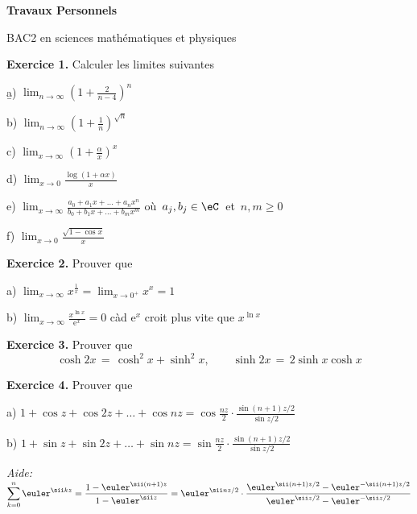 \begin{center}
\LARGE \bf
Travaux Personnels 
\end{center}

\begin{bf}
\begin{center}
BAC2 en sciences mathématiques et physiques
\end{center}
\end{bf}

{\bf Exercice 1.} Calculer les limites suivantes

\b
a) $\displaystyle \lim_{n \to \infty} \left( 1+ \frac{2}{n-4} \right)^n$

\medskip
b) 
$\displaystyle \lim_{n \to \infty} 
         \left( 1+ \frac 1n \right)^{\sqrt{n}}$

\medskip
c) $\displaystyle \lim_{x \to \infty} 
    \left( 1+ \frac \alpha x \right)^x$

\medskip
d) 
$\displaystyle \lim_{x \to 0} \frac{\log \left( 1+ \alpha x \right)}{x}$


\medskip
e) 
$\displaystyle \lim_{x \to \infty} 
\frac{a_0+a_1x + \dots +a_nx^n}{b_0+b_1x + \dots +b_mx^m}$
\quad où\, $a_j, b_j \in \eC$ \,et\, $n,m \ge 0$

\medskip
f) 
$\displaystyle \lim_{x \to 0} \frac{\sqrt{1-\cos x}}{x}$  




{\bf Exercice 2.} Prouver que

\medskip
a)
$\displaystyle \lim_{x \to \infty} x^{\frac 1x} = \lim_{x \to 0^+} x^x = 1$

\medskip
b)
$\displaystyle \lim_{x \to \infty} \frac{x^{\ln x}}{{\mathrm e}^x} =0$
\quad
càd ${\mathrm e}^x$ croit plus vite que $x^{\ln x}$


{\bf Exercice 3.} Prouver que
$$
\cosh 2x \,=\, \cosh^2 x + \sinh^2 x,
\qquad
\sinh 2x \,=\, 2 \sinh x \cosh x
$$


{\bf Exercice 4.} Prouver que

a)
$1 + \cos z + \cos 2z + \dots + \cos nz = \displaystyle \cos \frac{nz}{2} \cdot \frac{\sin (n+1)z/2}{\sin z/2}$

b)
$1 + \sin z + \sin 2z + \dots + \sin nz = \displaystyle \sin \frac{nz}{2} \cdot \frac{\sin (n+1)z/2}{\sin z/2}$

{\it Aide:}\;
$\displaystyle \sum_{k=0}^n 
\euler^{\sii kz} 
= 
\frac{1-\euler^{\sii (n+1)z}}{1-\euler^{\sii z}}
= \euler^{\sii nz/2} \cdot \frac{\euler^{\sii (n+1)z/2} - \euler^{-\sii (n+1)z/2}}{
\euler^{\sii z/2}-\euler^{-\sii z/2}}
$

